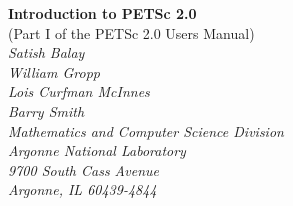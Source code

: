 %
%
%
%
\setlength{\textwidth}{6.5in}
\setlength{\oddsidemargin}{0.0in}
\setlength{\evensidemargin}{0.0in}
\setlength{\textheight}{9.2in}
\setlength{\topmargin}{-.8in}

\newcommand{\findex}[1]{\index{FUNCTION #1}}
\newcommand{\sindex}[1]{\index{#1}}
 
\def\design{\medskip \noindent Design Issue:\begin{em}}
\def\enddesign{\end{em} \medskip}


\def\shortintro{*}
\renewcommand{\cite}[1]{}
\def\thesection {$\!\!\!\!$}



\begin{center}
$\!$
\vspace{1.0cm}
\thispagestyle{empty}

{\huge \bf Introduction to PETSc 2.0}\\ 
\vspace{0.5cm}
{\LARGE (Part I of the PETSc 2.0 Users Manual)} \\
\vspace{1.5cm}
{\large \em Satish Balay\\William Gropp\\Lois Curfman McInnes\\Barry Smith\\
\medskip \medskip
Mathematics and Computer Science Division\\
Argonne National Laboratory\\
9700 South Cass Avenue\\
Argonne, IL 60439-4844\\
}
\end{center}

